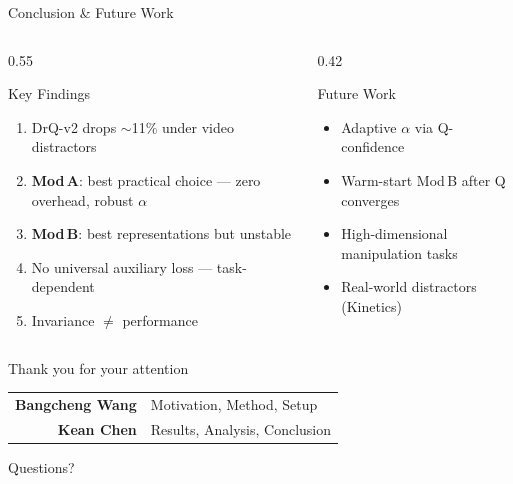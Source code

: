 \documentclass[aspectratio=169]{beamer}
\newcommand{\good}[1]{\textcolor{SuccessGreen}{\textbf{#1}}}
\newcommand{\bad}[1]{\textcolor{DangerRed}{\textbf{#1}}}
\begin{document}
\begin{frame}{Conclusion \& Future Work}

\small
\begin{columns}[T]
\begin{column}{0.55\textwidth}
\begin{block}{Key Findings}
\begin{enumerate}\setlength{\itemsep}{2pt}
    \item DrQ-v2 drops $\sim$11\% under video distractors
    \item \good{Mod\,A}: best practical choice --- zero overhead, robust $\alpha$
    \item \bad{Mod\,B}: best representations but unstable
    \item No universal auxiliary loss --- task-dependent
    \item Invariance $\neq$ performance
\end{enumerate}
\end{block}
\end{column}
\begin{column}{0.42\textwidth}
\begin{block}{Future Work}
\begin{itemize}\setlength{\itemsep}{2pt}
    \item Adaptive $\alpha$ via Q-confidence
    \item Warm-start Mod\,B after Q converges
    \item High-dimensional manipulation tasks
    \item Real-world distractors (Kinetics)
\end{itemize}
\end{block}
\end{column}
\end{columns}
\end{frame}

{
\begin{frame}[c]
    \centering
    {\Huge \textcolor{UofTBlue}{Thank you for your attention}}

    \vspace{1.5cm}
    \normalsize
    \begin{tabular}{rl}
    \textbf{Bangcheng Wang} & Motivation, Method, Setup \\
    \textbf{Kean Chen} & Results, Analysis, Conclusion \\
    \end{tabular}

    \vspace{1cm}
    {\small Questions?}
\end{frame}
}
\end{document}
